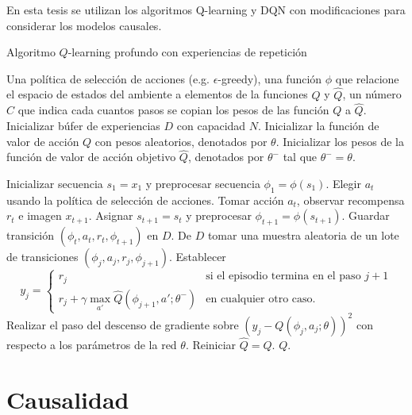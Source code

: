 En esta tesis se utilizan los algoritmos Q-learning y DQN con modificaciones para considerar los modelos causales.


\begin{mialgoritmo}[ht]
  	\caption{Algoritmo $Q$-learning profundo con experiencias de repetición}
	\label{alg:dqn-algo}
  \begin{algorithmic}[1]
  \REQUIRE Una política de selección de acciones (e.g. $\epsilon$-greedy), una función $\phi$ que relacione el espacio de estados del ambiente a elementos de la funciones $Q$ y $\hat{Q}$, un número $C$ que indica cada cuantos pasos se copian los pesos de las función $Q$ a $\hat{Q}$.
  \STATE Inicializar búfer de experiencias $D$ con capacidad $N$.
  \STATE Inicializar la función de valor de acción $Q$ con pesos aleatorios, denotados por $\theta$.
  \STATE Inicializar los pesos de la función de valor de acción objetivo $\hat{Q}$, denotados por $\theta^-$ tal que $\theta^- = \theta$.
  
    \STATE Inicializar secuencia $s_1 = {x_1}$ y preprocesar secuencia $\phi_1 = \phi(s_1)$.
    \STATE Elegir $a_t$ usando la política de selección de acciones.
    \STATE Tomar acción $a_t$, observar recompensa $r_{t}$ e imagen $x_{t+1}$.
    \STATE Asignar $s_{t+1} =  s_t$ y preprocesar $\phi_{t+1} = \phi(s_{t+1})$.
    \STATE Guardar transición $(\phi_t, a_t, r_t, \phi_{t+1})$ en $D$.
    \STATE De $D$ tomar una muestra aleatoria de un lote de transiciones $(\phi_j, a_j, r_j, \phi_{j+1})$.
    \STATE Establecer
	\[
	 y_j = 
   \begin{cases} 
      r_j  & \mbox{si el episodio termina en el paso } j + 1 \\
      r_j + \gamma \max_{a'}\hat{Q}(\phi_{j+1}, a'; \theta^-) &   \mbox{en cualquier otro caso.}
   \end{cases}
	\]
	\STATE Realizar el paso del
	descenso de gradiente sobre $(y_j -  Q(\phi_j,a_j;\theta))^2$ con respecto a los parámetros de la red $\theta$.
	\STATE Reiniciar $\hat{Q} = Q$.
	\ENDIF
    \ENDFOR
  \ENDFOR
  \RETURN $Q$.
  \end{algorithmic}
\end{mialgoritmo}




\section{Causalidad}\label{causation-section}


